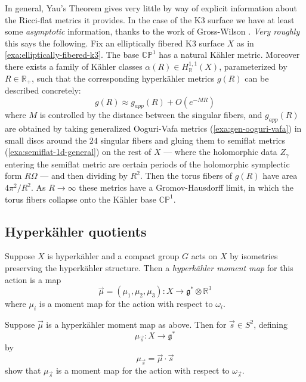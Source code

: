 \documentclass[12pt,letterpaper,reqno]{article}
\numberwithin{equation}{section}
\newcommand{\fg}{{\mathfrak g}}
\newcommand{\R}{\ensuremath{\mathbb R}}
\newcommand{\C}{\ensuremath{\mathbb C}}
\newcommand{\PP}{\ensuremath{\mathbb P}}
\newcommand{\kahler}{K\"ahler\xspace}
\newcommand{\hk}{hyperk\"ahler\xspace}
\newcommand{\Hk}{Hyperk\"ahler\xspace}
\newcommand{\ti}[1]{\textit{#1}}
\begin{document}
In general, Yau's Theorem gives very little by way of explicit information
about the Ricci-flat metrics it provides. In the case of the K3 surface
we have at least some \ti{asymptotic} information, thanks to the work
of Gross-Wilson \cite{MR1863732}. 
\ti{Very roughly} this says the following.
Fix an elliptically fibered K3 surface $X$ as in 
\autoref{exa:elliptically-fibered-k3}. The base $\C\PP^1$
has a natural \kahler metric.
Moreover there exists a family
of \kahler classes $\alpha(R) \in H^{1,1}_\R(X)$, 
parameterized by $R \in \R_+$, such that the corresponding \hk metrics
$g(R)$ can be described concretely: 
\begin{equation}
    g(R) \approx g_{app}(R) + O(e^{-M R})
\end{equation} 
where $M$ is controlled by the distance between the singular fibers,
and $g_{app}(R)$ are obtained by
taking generalized Ooguri-Vafa metrics (\autoref{exa:gen-ooguri-vafa})
in small discs around the $24$ singular fibers and gluing them to
semiflat metrics (\autoref{exa:semiflat-1d-general})
on the rest of $X$ --- where the holomorphic data $Z_\gamma$ entering
the semiflat metric
are certain periods of the holomorphic symplectic form 
$R \Omega$ --- and then dividing by $R^2$. 
Then the torus fibers of $g(R)$ have
area $4 \pi^2 / R^2$. As $R \to \infty$ these metrics 
have a Gromov-Hausdorff limit,
in which the torus fibers collapse onto the \kahler base $\C\PP^1$.



\subsection{\Hk quotients}

\begin{defn}[\Hk moment map] Suppose $X$ is \hk and a compact group
$G$ acts on $X$ by isometries preserving the \hk structure.
Then a \ti{\hk moment map} for this action is a map
\begin{equation}
  \vec\mu = (\mu_1, \mu_2, \mu_3): X \to \fg^* \otimes \R^3
\end{equation}
where $\mu_i$ is a moment map for the action with respect
to $\omega_i$.
\end{defn}

\begin{exercise} Suppose $\vec\mu$ is a \hk moment map as above.
Then for $\vec s \in S^2$, defining
\begin{equation}
  \mu_{\vec s}: X \to \fg^*
\end{equation}
by
\begin{equation}
  \mu_{\vec s} = \vec\mu \cdot \vec s
\end{equation}
show that $\mu_{\vec s}$ is a moment map for the action 
with respect to $\omega_{\vec s}$.
\end{exercise}
\end{document}
